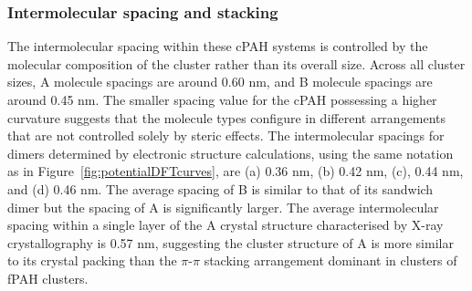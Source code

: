 \subsubsection{Intermolecular spacing and stacking}
The intermolecular spacing within these cPAH systems is controlled by the molecular composition of the cluster rather than its overall size.  Across all cluster sizes, A molecule spacings are around 0.60 nm, and B molecule spacings are around 0.45 nm.  The smaller spacing value for the cPAH possessing a higher curvature suggests that the molecule types configure in different arrangements that are not controlled solely by steric effects. %
The intermolecular spacings for dimers determined by electronic structure calculations, using the same notation as in Figure~\ref{fig:potentialDFTcurves}, are (a) 0.36 nm, (b) 0.42 nm, (c), 0.44 nm, and (d) 0.46 nm. The average spacing of B is similar to that of its sandwich dimer but the spacing of A is significantly larger. The average intermolecular spacing within a single layer of the A crystal structure characterised by X-ray crystallography is 0.57 nm, suggesting the cluster structure of A is more similar to its crystal packing than the $\pi$-$\pi$ stacking arrangement dominant in clusters of fPAH clusters.  

